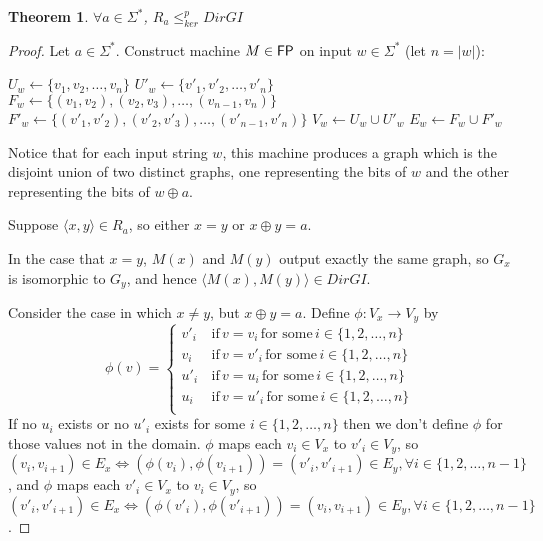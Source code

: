 \documentclass{article}
\newtheorem{theorem}{Theorem}[section]
\theoremstyle{definition} \newtheorem{definition}[definition]{Definition}
\newcommand{\plain}[1]{\,\text{#1}\,} %
\newcommand{\sigmastar}{\Sigma^{*}} %
\newcommand{\kr}{\leq^{p}_{ker}} %
\newcommand{\pair}[2]{\langle#1,#2\rangle} %
\begin{document}
\begin{theorem}\label{thm:ra_kr_dirgi}$\forall a\in\sigmastar$, $R_a \kr DirGI$
\end{theorem}
\begin{proof}
  Let $a\in\sigmastar$. Construct machine $M\in{\ensuremath{\mathsf{FP}}}$ on input $w\in\sigmastar$
  (let $n=|w|$):\\
  \begin{algorithm}[H]
    $U_w\gets\{v_1, v_2, \ldots, v_n\}$\;
    $U'_w\gets\{v'_1, v'_2, \ldots, v'_n\}$\;
    $F_w\gets\{(v_1, v_2), (v_2, v_3), \ldots, (v_{n-1},
    v_n)\}$\;
    $F'_w\gets\{(v'_1, v'_2), (v'_2, v'_3), \ldots, (v'_{n-1},
    v'_n)\}$\;
    $V_w\gets U_w\cup U'_w$\;
    $E_w\gets F_w\cup F'_w$\;
  \end{algorithm}
  Notice that for each input string $w$, this machine produces a graph which is
  the disjoint union of two distinct graphs, one representing the bits of $w$
  and the other representing the bits of $w\oplus a$.
  
  Suppose $\pair{x}{y}\in R_a$, so either $x=y$ or $x\oplus y=a$.
  
  In the case that $x=y$, $M(x)$ and $M(y)$ output exactly the same graph, so
  $G_x$ is isomorphic to $G_y$, and hence $\pair{M(x)}{M(y)}\in DirGI$.
  
  Consider the case in which $x\neq y$, but $x\oplus y=a$. Define $\phi\colon
  V_x\to V_y$ by
  \begin{displaymath}
    \phi(v)=
    \begin{cases}
      v'_i & \plain{if} v=v_i \plain{for some} i\in\{1, 2, \ldots, n\}\\
      v_i & \plain{if} v=v'_i \plain{for some} i\in\{1, 2, \ldots, n\}\\
      u'_i & \plain{if} v=u_i \plain{for some} i\in\{1, 2, \ldots, n\}\\
      u_i & \plain{if} v=u'_i \plain{for some} i\in\{1, 2, \ldots, n\}\\
    \end{cases}
  \end{displaymath}
  If no $u_i$ exists or no $u'_i$ exists for some $i\in\{1, 2, \ldots, n\}$
  then we don't define $\phi$ for those values not in the domain. $\phi$ maps
  each $v_i\in V_x$ to $v'_i\in V_y$, so $(v_i, v_{i+1})\in E_x \iff
  (\phi(v_i), \phi(v_{i+1}))=(v'_i, v'_{i+1})\in E_y, \forall i\in\{1, 2,
  \ldots, n-1\}$, and $\phi$ maps each $v'_i\in V_x$ to $v_i\in V_y$, so
  $(v'_i, v'_{i+1})\in E_x \iff (\phi(v'_i), \phi(v'_{i+1}))=(v_i, v_{i+1})\in
  E_y, \forall i\in\{1, 2, \ldots, n-1\}$.


\end{proof}
\end{document}

